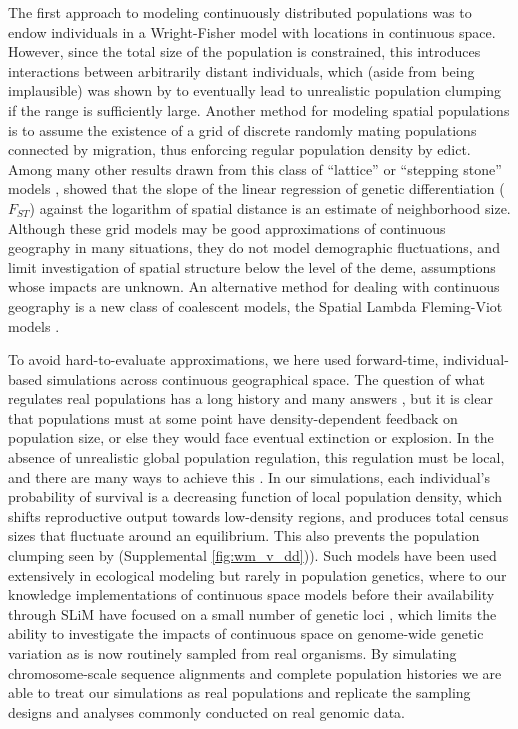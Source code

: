 \documentclass[10pt,twoside,lineno,hidelinks]{preprint}
\begin{document}
The first approach to modeling continuously distributed populations
was to endow individuals in a Wright-Fisher model with locations in continuous space.
However, since the total size of the population is constrained, this introduces interactions between arbitrarily distant individuals,
which (aside from being implausible) 
was shown by \citet{Felsenstein1975} to eventually lead to unrealistic population clumping
if the range is sufficiently large.
Another method for modeling spatial populations is to assume the existence of a grid of discrete randomly mating populations connected by migration, 
thus enforcing regular population density by edict.
Among many other results drawn from this class of ``lattice'' or ``stepping stone'' models
\citep{epperson2003geographical}, 
\citet{Rousset1997} showed that the slope of the linear regression of genetic differentiation ($F_{ST}$) against the logarithm of spatial distance is an estimate of neighborhood size. 
Although these grid models may be good approximations of continuous geography in many situations,
they do not model demographic fluctuations,
and limit investigation of spatial structure below the level of the deme,
assumptions whose impacts are unknown. 
An alternative method for dealing with continuous geography is a new class of coalescent models,
the Spatial Lambda Fleming-Viot models \citep{Barton2010,Kelleher2014}.

To avoid hard-to-evaluate approximations, we here used forward-time, individual-based simulations
across continuous geographical space.
The question of what regulates real populations has a long history and many answers
\citep[e.g.,][]{lloyd1967crowding,antonovics1980ecological,crawley1990population}, 
but it is clear that populations must at some point have density-dependent feedback on population size,
or else they would face eventual extinction or explosion.
In the absence of unrealistic global population regulation,
this regulation must be local,
and there are many ways to achieve this \citep{bolker2003spatial}.
In our simulations,
each individual's probability of survival is a decreasing function of local population density,
which shifts reproductive output towards low-density regions,
and produces total census sizes that fluctuate around an equilibrium. 
This also prevents the population clumping seen by \citet{Felsenstein1975}
(Supplemental \autoref{fig:wm_v_dd})). 
Such models have been used extensively in ecological modeling
\citep{durrett1994importance,bolker1997using,law2003population,fournier2004microscopic,champer2019suppression}
but rarely in population genetics, 
where to our knowledge implementations of continuous space models
before their availability through SLiM \citep{Haller2019}
have focused on a small number of genetic loci
\citep[e.g.,][]{slatkin1989comparison,barton2002neutral,robledoarnuncio2010isolation,rossine2014espao},
which limits the ability to investigate the impacts of continuous space on genome-wide genetic variation as is now routinely sampled from real organisms. 
By simulating chromosome-scale sequence alignments and complete population histories we are able to treat our simulations as real populations and replicate the sampling designs and analyses commonly conducted on real genomic data.
\end{document}
